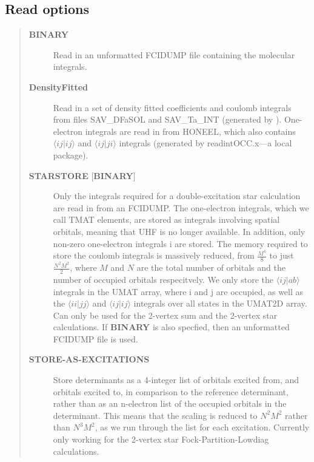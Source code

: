 \documentclass[openany,a4paper,10pt]{manual}
\newcommand{\bra}{\ensuremath{\langle}}
\newcommand{\ket}{\ensuremath{\rangle}}
\begin{document}
\subsection{Read options}
\begin{quote}
\begin{description}
\item[\textbf{BINARY}]
Read in an unformatted FCIDUMP file containing the molecular
integrals.

\item[\textbf{DensityFitted}]
Read in a set of density fitted coefficients and coulomb integrals
from files SAV\_DFaSOL and SAV\_Ta\_INT (generated by \cite{CamCasp}).
One-electron integrals are read in from HONEEL, which also contains
$\bra ij | ij \ket$ and $\bra ij | ji \ket$ integrals
(generated by readintOCC.x---a local package).

\item[\textbf{STARSTORE} {[}\textbf{BINARY}{]}]
Only the integrals required for a double-excitation star
calculation are read in from an FCIDUMP.  The one-electron
integrals, which we call TMAT elements, are stored as integrals
involving spatial orbitals, meaning that UHF is no longer
available.  In addition, only non-zero one-electron integrals i
are stored. The memory required to store the coulomb integrals
is massively reduced, from  $\frac{M^4}{8}$ to just
$\frac{N^{2} M^{2}}{2}$, where $M$ and $N$ are
the total number of orbitals and the number of occupied orbitals
respecitvely.  We only store the $\bra ij | ab \ket$
integrals in the UMAT array, where i and j are occupied, as well
as the $\bra ii | jj \ket$ and $\bra ij | ij \ket$
integrals over all states in the UMAT2D array.  Can only
be used for the 2-vertex sum and the 2-vertex star calculations.
If \textbf{BINARY} is also specfied, then an unformatted FCIDUMP file
is used.

\item[\textbf{STORE-AS-EXCITATIONS}]
Store determinants as a 4-integer list of orbitals excited from, and
orbitals excited to, in comparison to the reference determinant,
rather than as an n-electron list of the occupied orbitals
in the determinant. This means that the scaling is reduced to
$N^2M^2$ rather than $N^3M^2$, as we run through the
list for each excitation.  Currently only working for the 2-vertex
star Fock-Partition-Lowdiag calculations.

\end{description}
\end{quote}
\end{document}
